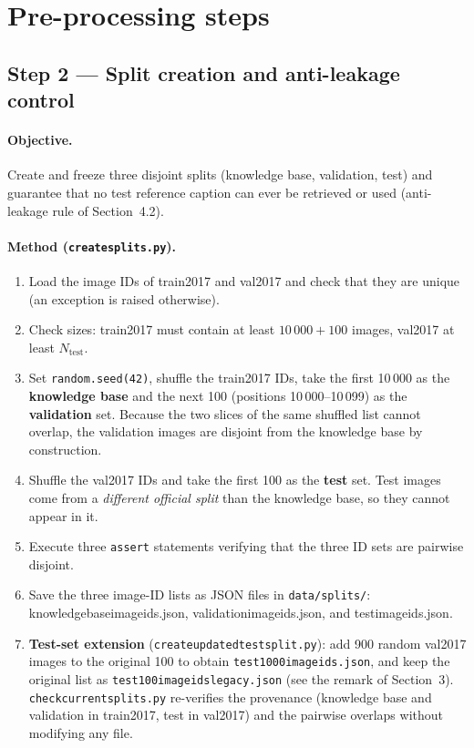 \documentclass[11pt,a4paper]{article}
\renewcommand{\_}{\textunderscore\allowbreak{}}
\newcommand{\code}[1]{\texttt{#1}}
\begin{document}
\section{Pre-processing steps}

\subsection{Step 2 --- Split creation and anti-leakage control}
\label{sec:splits}

\paragraph{Objective.} Create and freeze three disjoint splits (knowledge base, validation, test) and guarantee that no test reference caption can ever be retrieved or used (anti-leakage rule of Section~4.2).

\paragraph{Method (\code{create\_splits.py}).}
\begin{enumerate}[nosep]
  \item Load the image IDs of train2017 and val2017 and check that they are unique (an exception is raised otherwise).
  \item Check sizes: train2017 must contain at least $10\,000+100$ images, val2017 at least $N_{\text{test}}$.
  \item Set \code{random.seed(42)}, shuffle the train2017 IDs, take the first 10\,000 as the \textbf{knowledge base} and the next 100 (positions 10\,000--10\,099) as the \textbf{validation} set. Because the two slices of the same shuffled list cannot overlap, the validation images are disjoint from the knowledge base by construction.
  \item Shuffle the val2017 IDs and take the first 100 as the \textbf{test} set. Test images come from a \emph{different official split} than the knowledge base, so they cannot appear in it.
  \item Execute three \code{assert} statements verifying that the three ID sets are pairwise disjoint. 
  \item Save the three image-ID lists as JSON files in \code{data/splits/}: knowledge\_base\_image\_ids.json, validation\_image\_ids.json, and test\_image\_ids.json.
  \item \textbf{Test-set extension} (\code{create\_updated\_test\_split.py}): add 900 random val2017 images to the original 100 to obtain \code{test\_1000\_image\_ids.json}, and keep the original list as \code{test\_100\_image\_ids\_legacy.json} (see the remark of Section~3). \code{check\_current\_splits.py} re-verifies the provenance (knowledge base and validation in train2017, test in val2017) and the pairwise overlaps without modifying any file.
\end{enumerate}
\end{document}
